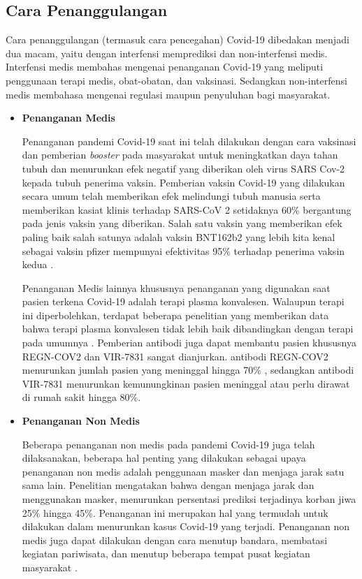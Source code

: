 \subsection{Cara Penanggulangan}
Cara penanggulangan (termasuk cara pencegahan) Covid-19 dibedakan menjadi dua macam, yaitu dengan interfensi memprediksi
dan non-interfensi medis. Interfensi medis membahas mengenai penanganan Covid-19 yang meliputi penggunaan terapi medis,
obat-obatan, dan vaksinasi. Sedangkan non-interfensi medis membahasa mengenai regulasi maupun penyuluhan
bagi masyarakat.

\begin{itemize}
    \item \textbf{Penanganan Medis}
    
        Penanganan pandemi Covid-19 saat ini telah dilakukan dengan cara vaksinasi dan pemberian \textit{booster}
        pada masyarakat untuk meningkatkan daya tahan tubuh dan menurunkan efek negatif yang diberikan oleh virus
        SARS Cov-2 kepada tubuh penerima vaksin. Pemberian vaksin Covid-19 yang dilakukan secara umum telah memberikan efek melindungi 
        tubuh manusia serta memberikan kasiat klinis terhadap SARS-CoV 2 setidaknya 60\% bergantung pada jenis
        vaksin yang diberikan. Salah satu vaksin yang memberikan efek paling baik salah satunya adalah vaksin
        BNT162b2 yang lebih kita kenal sebagai vaksin pfizer mempunyai efektivitas 95\% terhadap penerima vaksin 
        kedua \cite{pmid33301246}.

        Penanganan Medis lainnya khususnya penanganan yang digunakan saat pasien terkena Covid-19 adalah terapi
        plasma konvalesen. Walaupun terapi ini diperbolehkan, terdapat beberapa penelitian yang memberikan data
        bahwa terapi plasma konvalesen tidak lebih baik dibandingkan dengan terapi pada umumnya \cite{pmid33232588,pmid32492084}.
        Pemberian antibodi juga dapat membantu pasien khususnya REGN-COV2 dan VIR-7831 sangat dianjurkan. antibodi
        REGN-COV2 menurunkan jumlah pasien yang meninggal hingga 70\% \cite{pmid33332778}, sedangkan antibodi 
        VIR-7831 menurunkan kemunungkinan pasien meninggal atau perlu dirawat di rumah sakit hingga 80\%. 

    \item \textbf{Penanganan Non Medis}
    
        Beberapa penanganan non medis pada pandemi Covid-19 juga telah dilaksanakan, beberapa hal penting yang dilakukan
        sebagai upaya penanganan non medis adalah penggunaan masker dan menjaga jarak satu sama lain. Penelitian \cite{HANTHANANARACHCHILAGE2021111458}
        mengatakan bahwa dengan menjaga jarak dan menggunakan masker, menurunkan persentasi prediksi terjadinya korban
        jiwa 25\% hingga 45\%. Penanganan ini merupakan hal yang termudah untuk dilakukan dalam menurunkan kasus
        Covid-19 yang terjadi. Penanganan non medis juga dapat dilakukan dengan cara menutup bandara, membatasi 
        kegiatan pariwisata, dan menutup beberapa tempat pusat kegiatan masyarakat \cite{GE2022102649}.

\end{itemize}


